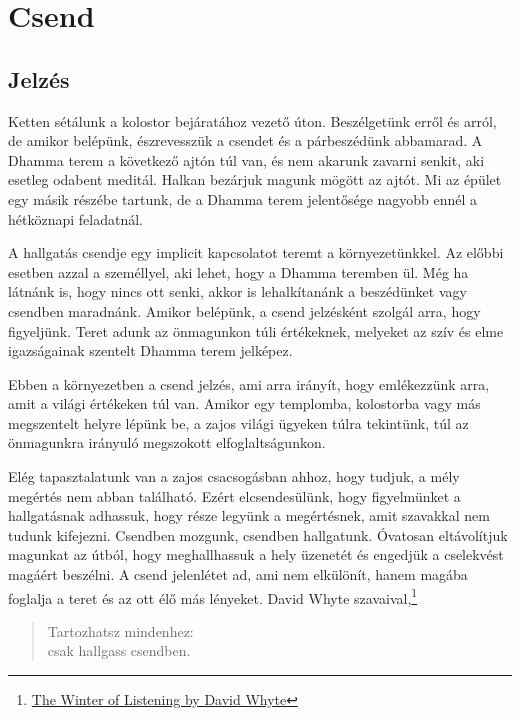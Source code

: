 \chapter{Csend}

\section{Jelzés}


\noindent Ketten sétálunk a kolostor bejáratához vezető úton.
Beszélgetünk erről és arról, de amikor belépünk, észrevesszük a csendet
és a párbeszédünk abbamarad. A Dhamma terem a következő ajtón túl van,
és nem akarunk zavarni senkit, aki esetleg odabent meditál. Halkan
bezárjuk magunk mögött az ajtót. Mi az épület egy másik részébe tartunk,
de a Dhamma terem jelentősége nagyobb ennél a hétköznapi feladatnál.

A hallgatás csendje egy implicit kapcsolatot teremt a környezetünkkel.
Az előbbi esetben azzal a személlyel, aki lehet, hogy a Dhamma teremben
ül. Még ha látnánk is, hogy nincs ott senki, akkor is lehalkítanánk a
beszédünket vagy csendben maradnánk. Amikor belépünk, a csend jelzésként
szolgál arra, hogy figyeljünk. Teret adunk az önmagunkon túli
értékeknek, melyeket az szív és elme igazságainak szentelt Dhamma terem
jelképez.

Ebben a környezetben a csend jelzés, ami arra irányít, hogy emlékezzünk
arra, amit a világi értékeken túl van. Amikor egy templomba, kolostorba
vagy más megszentelt helyre lépünk be, a zajos világi ügyeken túlra
tekintünk, túl az önmagunkra irányuló megszokott elfoglaltságunkon.

Elég tapasztalatunk van a zajos csacsogásban ahhoz, hogy tudjuk, a mély
megértés nem abban található. Ezért elcsendesülünk, hogy figyelmünket a
hallgatásnak adhassuk, hogy része legyünk a megértésnek, amit szavakkal
nem tudunk kifejezni. Csendben mozgunk, csendben hallgatunk. Óvatosan
eltávolítjuk magunkat az útból, hogy meghallhassuk a hely üzenetét és
engedjük a cselekvést magáért beszélni. A csend jelenlétet ad, ami nem
elkülönít, hanem magába foglalja a teret és az ott élő más lényeket.
David Whyte szavaival,\footnote{\href{https://www.goodreads.com/quotes/10119971-the-winter-of-listening-no-one-but-me-by-the}{The
  Winter of Listening by David Whyte}}

\begin{quote}
Tartozhatsz mindenhez:\\
csak hallgass csendben.
\end{quote}

